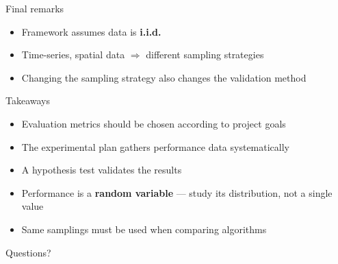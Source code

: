 
\begin{frame}{Final remarks}
  \begin{itemize}
    \item Framework assumes data is \textbf{i.i.d.}
    \item Time-series, spatial data $\Rightarrow$ different sampling strategies
    \item Changing the sampling strategy also changes the validation method
  \end{itemize}
\end{frame}


\begin{frame}{Takeaways}
  \begin{itemize}
    \item Evaluation metrics should be chosen according to project goals
    \item The experimental plan gathers performance data systematically
    \item A hypothesis test validates the results
    \item Performance is a \textbf{random variable} --- study its distribution,
      not a single value
    \item Same samplings must be used when comparing algorithms
  \end{itemize}
\end{frame}


\begin{frame}[standout]
  Questions?
\end{frame}


